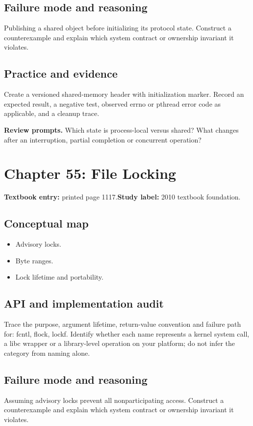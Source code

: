 \documentclass[11pt,letterpaper,oneside]{report}
\begin{document}
\subsection{Failure mode and reasoning}
Publishing a shared object before initializing its protocol state. Construct a counterexample and explain which system contract or ownership invariant it violates.

\subsection{Practice and evidence}
Create a versioned shared-memory header with initialization marker. Record an expected result, a negative test, observed errno or pthread error code as applicable, and a cleanup trace.

\textbf{Review prompts.} Which state is process-local versus shared? What changes after an interruption, partial completion or concurrent operation?

\section{Chapter 55: File Locking}
\textbf{Textbook entry:} printed page 1117.\quad \textbf{Study label:} 2010 textbook foundation.

\subsection{Conceptual map}
\begin{itemize}
\item Advisory locks.
\item Byte ranges.
\item Lock lifetime and portability.
\end{itemize}
\subsection{API and implementation audit}
Trace the purpose, argument lifetime, return-value convention and failure path for: fcntl, flock, lockf. Identify whether each name represents a kernel system call, a libc wrapper or a library-level operation on your platform; do not infer the category from naming alone.

\subsection{Failure mode and reasoning}
Assuming advisory locks prevent all nonparticipating access. Construct a counterexample and explain which system contract or ownership invariant it violates.
\end{document}
